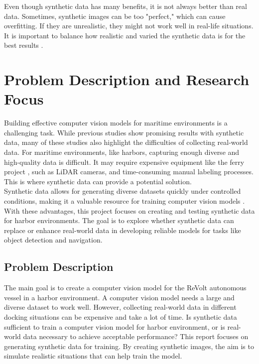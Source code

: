 \noindent Even though synthetic data has many benefits, it is not always better than real data. Sometimes, synthetic images can be too "perfect," which can cause overfitting. If they are unrealistic, they might not work well in real-life situations. It is important to balance how realistic and varied the synthetic data is for the best results \cite{nikolenko2021synthetic}.


\section{Problem Description and Research Focus}

Building effective computer vision models for maritime environments is a challenging task. While previous studies show promising results with synthetic data, many of these studies also highlight the difficulties of collecting real-world data. For maritime environments, like harbors, capturing enough diverse and high-quality data is difficult. It may require expensive equipment like the ferry project \cite{NTNUFerry}, such as LiDAR cameras, and time-consuming manual labeling processes. This is where synthetic data can provide a potential solution. \\

\noindent Synthetic data allows for generating diverse datasets quickly under controlled conditions, making it a valuable resource for training computer vision models \cite{nikolenko2021synthetic}. With these advantages, this project focuses on creating and testing synthetic data for harbor environments. The goal is to explore whether synthetic data can replace or enhance real-world data in developing reliable models for tasks like object detection and navigation.


\subsection{Problem Description}
The main goal is to create a computer vision model for the ReVolt autonomous vessel in a harbor environment. A computer vision model needs a large and diverse dataset to work well. However, collecting real-world data in different docking situations can be expensive and take a lot of time. Is synthetic data sufficient to train a computer vision model for harbor environment, or is real-world data necessary to achieve acceptable performance? This report focuses on generating synthetic data for training. By creating synthetic images, the aim is to simulate realistic situations that can help train the model.  

